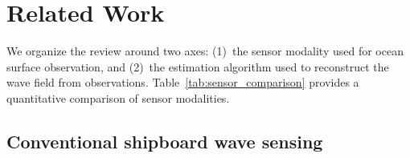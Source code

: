 \documentclass[review]{elsarticle}
\begin{document}
\section{Related Work}
\label{sec:related}

We organize the review around two axes: (1)~the sensor modality
used for ocean surface observation, and (2)~the estimation algorithm
used to reconstruct the wave field from observations.
Table~\ref{tab:sensor_comparison} provides a quantitative comparison
of sensor modalities.

\begin{table}[t]
\centering
\caption{Comparison of ocean surface sensing modalities for vessel-scale
wave field estimation. Typical values for operational systems.}
\label{tab:sensor_comparison}
\end{table}

\subsection{Conventional shipboard wave sensing}
\end{document}
